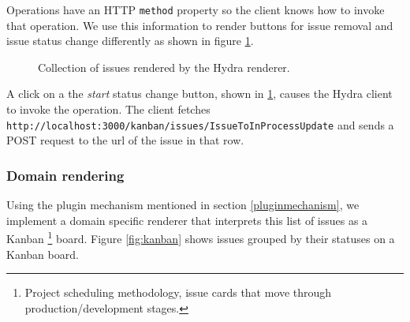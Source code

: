 Operations have an HTTP \lstinline{method} property so the client knows how to invoke that operation. We use this information to render buttons for issue removal and issue status change differently as shown in figure \ref{fig:issueshydra}.

\begin{figure}[!htb]
  \caption{Collection of issues rendered by the Hydra renderer.}
  \label{fig:issueshydra}
\end{figure}

A click on a the \textit{start} status change button, shown in \ref{fig:issueshydra}, causes the Hydra client to invoke the operation. The client fetches \lstinline{http://localhost:3000/kanban/issues/IssueToInProcessUpdate} and sends a POST request to the \gls{url} of the issue in that row.

\subsubsection{Domain rendering}
Using the plugin mechanism mentioned in section \ref{pluginmechanism}, we implement a domain specific renderer that interprets this list of issues as a Kanban \footnote{Project scheduling methodology, issue cards that move through production/development stages.} board. Figure \ref{fig:kanban} shows issues grouped by their statuses on a Kanban board.

\clearpage

